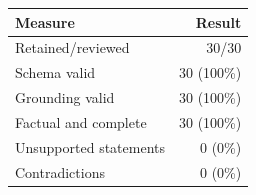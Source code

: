 \begin{tabular}{lr}
\toprule
Measure & Result \\
\midrule
Retained/reviewed & 30/30 \\
Schema valid & 30 (100\%) \\
Grounding valid & 30 (100\%) \\
Factual and complete & 30 (100\%) \\
Unsupported statements & 0 (0\%) \\
Contradictions & 0 (0\%) \\
\bottomrule
\end{tabular}
